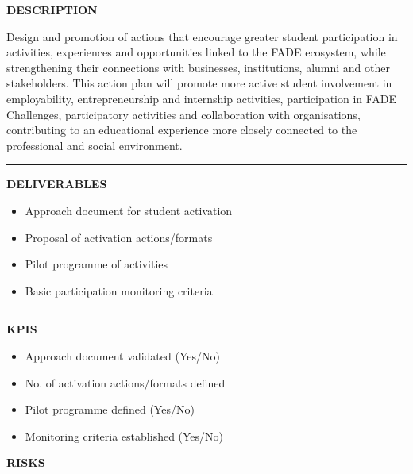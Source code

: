 \documentclass[11pt,a4paper]{scrreprt}
\newcommand{\fieldlabel}[1]{%
  {\footnotesize\sffamily\bfseries\color{mutedcolor}\MakeUppercase{#1}}\par\nopagebreak[4]
}
\newcommand{\fieldsep}{\vspace{3pt}\noindent\textcolor{bordercolor}{\rule{\linewidth}{0.4pt}}\vspace{3pt}\par}
\begin{document}
\begin{tcolorbox}[pabox={filcolor}{A.P.2.2 \enspace\textbullet\enspace Promotion of Student Participation and Connection with the FADE Ecosystem and its Environment}]

\fieldlabel{Description}
{\small Design and promotion of actions that encourage greater student participation in activities, experiences and opportunities linked to the FADE ecosystem, while strengthening their connections with businesses, institutions, alumni and other stakeholders. This action plan will promote more active student involvement in employability, entrepreneurship and internship activities, participation in FADE Challenges, participatory activities and collaboration with organisations, contributing to an educational experience more closely connected to the professional and social environment. }\par
\fieldsep
\fieldlabel{Deliverables}
{\small \begin{itemize}[noitemsep,topsep=2pt]
\item Approach document for student activation
\item Proposal of activation actions/formats
\item Pilot programme of activities
\item Basic participation monitoring criteria
\end{itemize}}\par
\fieldsep
\fieldlabel{KPIs}
{\small \begin{itemize}[noitemsep,topsep=2pt]
\item Approach document validated (Yes/No)
\item No. of activation actions/formats defined
\item Pilot programme defined (Yes/No)
\item Monitoring criteria established (Yes/No)
\end{itemize}}\par
\end{tcolorbox}
\begin{tcolorbox}[riskbox]
{\footnotesize\sffamily\bfseries\color{red!50!black} RISKS}\par{}
\end{tcolorbox}
\end{document}
